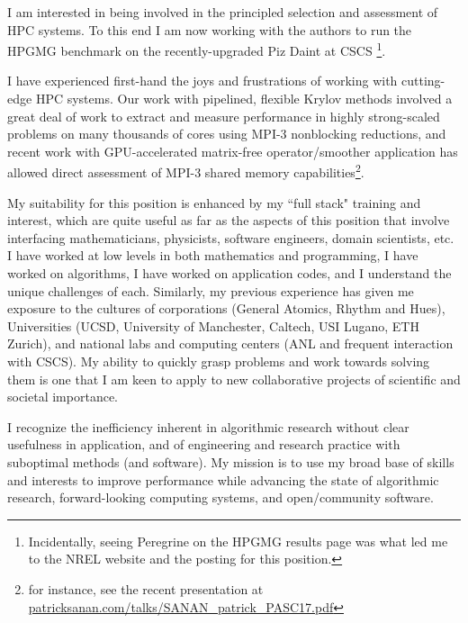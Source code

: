 \documentclass{letter}
\begin{document}
\begin{letter}{}
I am interested in being involved in the principled selection and assessment of HPC systems. To this end I am now working with the authors to run the HPGMG benchmark on the recently-upgraded Piz Daint at CSCS \footnote{Incidentally, seeing Peregrine on the HPGMG results page was what led me to the NREL website and the posting for this position.}.

  I have experienced first-hand the joys and frustrations of working with cutting-edge HPC systems. Our work with pipelined, flexible Krylov methods involved a great deal of work to extract and measure performance in highly strong-scaled problems on many thousands of cores using MPI-3 nonblocking reductions, and recent work with GPU-accelerated matrix-free operator/smoother application has allowed direct assessment of MPI-3 shared memory capabilities\footnote{for instance, see the recent presentation at \href{http://www.patricksanan.com/talks/SANAN_patrick_PASC17.pdf}{patricksanan.com/talks/SANAN\_patrick\_PASC17.pdf}}.





My suitability for this position is enhanced by my ``full stack" training and interest, which are quite useful as far as the aspects of this position that involve interfacing mathematicians, physicists, software engineers, domain scientists, etc. I have worked at low levels in both mathematics and programming, I have worked on algorithms, I have worked on application codes, and I understand the unique challenges of each.
Similarly, my previous experience has given me exposure to the cultures of corporations (General Atomics, Rhythm and Hues), Universities (UCSD, University of Manchester, Caltech, USI Lugano, ETH Zurich), and national labs and computing centers (ANL and frequent interaction with CSCS).
  My ability to quickly grasp problems and work towards solving them is one that I am keen to apply to new collaborative projects of scientific and societal importance.

  I recognize the inefficiency inherent in algorithmic research without clear usefulness in application, and of engineering and research practice with suboptimal methods (and software). My mission is to use my broad base of skills and interests to improve performance while advancing the state of algorithmic research, forward-looking computing systems, and open/community software.


\end{letter}
\end{document}
